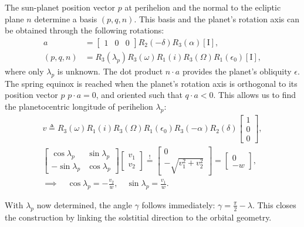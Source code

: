 \documentclass[12pt]{article}
\begin{document}
The sun-planet position vector $p$ at perihelion and the normal to the ecliptic
plane $n$ determine a basis $(p,q,n)$. This basis and the planet's rotation axis
can be obtained through the following rotations:
\begin{align}
    a &= 
    \begin{bmatrix}
        1 & 0 & 0
    \end{bmatrix}
    R_2(-\delta) R_3(\alpha) [\mathrm{I}],\\
    (p,q,n) &= R_3(\lambda_p) 
        R_3(\omega) R_1(i) R_3(\Omega) R_1(\epsilon_0)
    [\mathrm{I}],
\end{align}
where only $\lambda_p$ is unknown. 
The dot product $n\cdot a$ provides the planet's obliquity $\epsilon$.
The spring equinox is reached when 
the planet's rotation axis is orthogonal to its position vector $p$
$p\cdot a=0$, and oriented such that $q \cdot a<0$. This allows us to find 
the planetocentric longitude of perihelion $\lambda_p$:
\begin{gather}
    v \triangleq R_3(\omega) R_1(i) R_3(\Omega) R_1(\epsilon_0) R_3(-\alpha) R_2(\delta)
    \begin{bmatrix}
        1\\
        0\\
        0
    \end{bmatrix},\\
    \begin{bmatrix}
        \cos \lambda_p & \sin \lambda_p\\
        -\sin \lambda_p & \cos \lambda_p
    \end{bmatrix}
    \begin{bmatrix}
        v_1\\
        v_2
    \end{bmatrix}
    \overset{!}{=}
    \begin{bmatrix}
        0\\
        -\sqrt{v_1^2+v_2^2}
    \end{bmatrix}
    = 
    \begin{bmatrix}
        0\\
        -w
    \end{bmatrix},\\[6pt]
    \implies \quad \cos \lambda_p = -\frac{v_2}{w}, \quad
    \sin \lambda_p = \frac{v_1}{w}.
\end{gather}

With $\lambda_p$ now determined, the angle $\gamma$ follows immediately:
$\gamma = \frac{\pi}{2} - \lambda$. This closes the construction by 
linking the solstitial direction to the orbital geometry.
\end{document}
